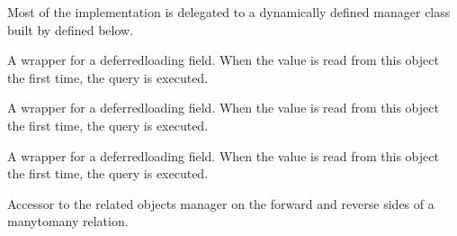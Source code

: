 \documentclass[letterpaper,10pt,english]{sphinxmanual}
\begin{document}
\begin{fulllineitems}
\begin{fulllineitems}
Most of the implementation is delegated to a dynamically defined manager
class built by  defined below.

\end{fulllineitems}


\begin{fulllineitems}
\label{\detokenize{accounts:accounts.models.User.stripe_auto_confirmed}}
A wrapper for a deferred\sphinxhyphen{}loading field. When the value is read from this
object the first time, the query is executed.

\end{fulllineitems}


\begin{fulllineitems}
\label{\detokenize{accounts:accounts.models.User.stripe_customer_id}}
A wrapper for a deferred\sphinxhyphen{}loading field. When the value is read from this
object the first time, the query is executed.

\end{fulllineitems}


\begin{fulllineitems}
\label{\detokenize{accounts:accounts.models.User.system_number}}
A wrapper for a deferred\sphinxhyphen{}loading field. When the value is read from this
object the first time, the query is executed.

\end{fulllineitems}


\begin{fulllineitems}
\label{\detokenize{accounts:accounts.models.User.user_permissions}}
Accessor to the related objects manager on the forward and reverse sides of
a many\sphinxhyphen{}to\sphinxhyphen{}many relation.


\end{fulllineitems}
\end{fulllineitems}
\end{document}
